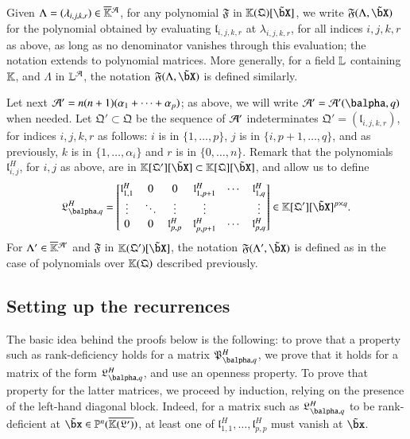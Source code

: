 \documentclass[amsthm]{elsart}
\begin{document}
Given $\Lambda=(\lambda_{i,j,k,r})\in \KKbar{}^{\cal A}$, for any polynomial
$\mathfrak{F}$ in $\KK(\mathfrak{Q})[\tilde \bX]$, we write
$\mathfrak{F}(\Lambda,\tilde\bX)$ for the polynomial obtained by
evaluating $\mathfrak{l}_{i,j,k,r}$ at $\lambda_{i,j,k,r}$, for all
indices $i,j,k,r$ as above, as long as no denominator vanishes through
this evaluation; the notation extends to polynomial matrices. More
generally, for a field $\mathbb{L}$ containing $\mathbb{K}$, and $\Lambda$ in $\LL^{\cal A}$, the
notation $\mathfrak{F}(\Lambda,\tilde\bX)$ is defined similarly.

Let next ${\cal A}'=n(n+1)(\alpha_1+\cdots+\alpha_p)$; as above, 
we will write ${\cal A}'={\cal A}'(\balpha,q)$ when needed. Let
$\mathfrak{Q}'\subset \mathfrak{Q}$ be the sequence of ${\cal A}'$
indeterminates $\mathfrak{Q}'=(\mathfrak{l}_{i,j,k,r})$, for indices
$i,j,k,r$ as follows: $i$ is in $\{1,\dots,p\}$, $j$ is in
$\{i,p+1,\dots,q\}$, and as previously, $k$ is in
$\{1,\dots,\alpha_i\}$ and $r$ is in $\{0,\dots,n\}$. Remark that the
polynomials $\mathfrak{l}^H_{i,j}$, for $i,j$ as above, are in
$\KK[\mathfrak{Q}'][\tilde\bX] \subset \KK[\mathfrak{Q}][\tilde \bX]$,
and allow us to define
\begin{align}\label{eq:matMprime}
\mathfrak{L}^H_{\balpha,q}=\left [\begin{matrix} \mathfrak{l}^H_{1,1} & 0 & 0
    &\mathfrak{l}^H_{1,p+1} & \cdots & \mathfrak{l}^H_{1,q}\\ \vdots & \ddots &
    \vdots & \vdots & & \vdots\\ 0&0& \mathfrak{l}^H_{p,p}
    &\mathfrak{l}^H_{p,p+1} & \cdots & \mathfrak{l}^H_{p,q}
  \end{matrix}\right ]\in \KK[\mathfrak{Q}'][\tilde\bX]^{p\times q}.
\end{align}
For $\Lambda' \in \KKbar{}^{{\cal A}'}$ and $\mathfrak{F}$ in 
$\KK(\mathfrak{Q}')[\tilde\bX]$, the notation
$\mathfrak{F}(\Lambda',\tilde\bX)$ is defined as in the case of
polynomials over $\mathbb{K}(\mathfrak{Q})$ described previously.


\subsection{Setting up the recurrences}
The basic idea behind the proofs below is the following: to prove that
a property such as rank-deficiency holds for a matrix
$\mathfrak{P}^H_{\balpha,q}$, we prove that it holds for a matrix of
the form $\mathfrak{L}^H_{\balpha,q}$, and use an openness
property. To prove that property for the latter matrices, we proceed
by induction, relying on the presence of the left-hand diagonal
block. Indeed, for a matrix such as $\mathfrak{L}^H_{\balpha,q}$ to be
rank-deficient at $\tilde\bx \in \P^n(\KKGpbar)$, at least one of
$\mathfrak{l}^H_{1,1},\dots,\mathfrak{l}^H_{p,p}$ must vanish at
$\tilde\bx$.
\end{document}
